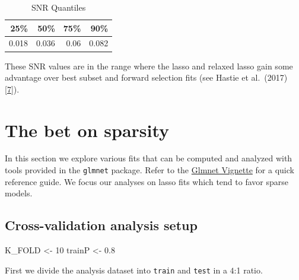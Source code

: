 \documentclass[
]{book}
\newenvironment{Shaded}{\begin{snugshade}}{\end{snugshade}}
\newcommand{\DecValTok}[1]{\textcolor[rgb]{0.00,0.00,0.81}{#1}}
\newcommand{\FloatTok}[1]{\textcolor[rgb]{0.00,0.00,0.81}{#1}}
\newcommand{\NormalTok}[1]{#1}
\newcommand{\StringTok}[1]{\textcolor[rgb]{0.31,0.60,0.02}{#1}}
\begin{document}
\begin{table}

\caption{\label{tab:plotSNR}SNR Quantiles}
\centering
\begin{tabular}[t]{r|r|r|r}
\hline
25\% & 50\% & 75\% & 90\%\\
\hline
0.018 & 0.036 & 0.06 & 0.082\\
\hline
\end{tabular}
\end{table}

These SNR values are in the range where the lasso and relaxed lasso gain some advantage over
best subset and forward selection fits (see Hastie et al.~(2017) {[}\protect\hyperlink{ref-Hastie:2017aa}{7}{]}).

\hypertarget{explore-sparsity}{%
\chapter{The bet on sparsity}\label{explore-sparsity}}

In this section we explore various fits that can be computed
and analyzed with tools provided in the \texttt{glmnet} package.
Refer to the \href{https://web.stanford.edu/~hastie/glmnet/glmnet_alpha.html}{Glmnet Vignette}
for a quick reference guide. We focus our analyses on lasso fits
which tend to favor sparse models.

\hypertarget{cross-validation-analysis-setup}{%
\section{Cross-validation analysis setup}\label{cross-validation-analysis-setup}}

\begin{Shaded}
\begin{Highlighting}[]
\NormalTok{K\_FOLD <{-}}\StringTok{ }\DecValTok{10}
\NormalTok{trainP <{-}}\StringTok{ }\FloatTok{0.8}
\end{Highlighting}
\end{Shaded}

First we divide the analysis dataset into \texttt{train} and \texttt{test} in a \(4\):1 ratio.
\end{document}
